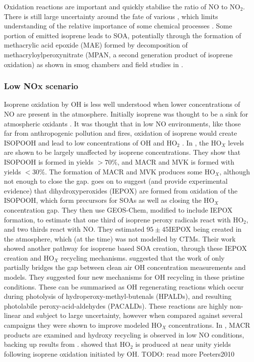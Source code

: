       
      Oxidation reactions are important and quickly stabilise the ratio of NO to NO$_2$. 
      There is still large uncertainty around the fate of various \roo, which limits understanding of the relative importance of some chemical processes \citep{Crounse2013}.
      Some portion of emitted isoprene leads to SOA, potentially through the formation of methacrylic acid epoxide (MAE) formed by decomposition of methacryloylperoxynitrate (MPAN, a second generation product of isoprene oxidation) as shown in smog chambers and field studies in \cite{Lin2013}.
    
    \subsubsection{Low NOx scenario}
      Isoprene oxidation by OH is less well understood when lower concentrations of NO are present in the atmosphere.
      Initially isoprene was thought to be a sink for atmospheric oxidants \citep[e.g.][]{Guenther2000}.
      It was thought that in low NO environments, like those far from anthropogenic pollution and fires, oxidation of isoprene would create ISOPOOH and lead to low concentrations of OH and HO$_2$ \cite{Paulot2009b}.
      In \cite{Paulot2009b}, the HO$_X$ levels are shown to be largely unaffected by isoprene concentrations.
      They show that ISOPOOH is formed in yields $> 70\%$, and MACR and MVK is formed with yields $< 30\%$.
      The formation of MACR and MVK produces some HO$_X$, although not enough to close the gap.
      \cite{Paulot2009b} goes on to suggest (and provide experimental evidence) that dihydroxyperoxides (IEPOX) are formed from oxidation of the ISOPOOH, which form precursors for SOAs as well as closing the HO$_X$ concentration gap.
      They then use GEOS-Chem, modified to include IEPOX formation, to estimate that one third of isoprene peroxy radicals react with HO$_2$, and two thirds react with NO. 
      They estimated $95 \pm 45$\tgpyr IEPOX being created in the atmosphere, which (at the time) was not modelled by CTMs.
      Their work showed another pathway for isoprene based SOA creation, through these IEPOX creation and HO$_X$ recycling mechanisms.
      \cite{Peeters2010} suggested that the work of \cite{Paulot2009b} only partially bridges the gap between clean air OH concentration measurements and models.
      They suggested four new mechanisms for OH recycling in these pristine conditions.
      These can be summarised as OH regenerating reactions which occur during photolysis of hydroperoxy-methyl-butenals (HPALDs), and resulting photolabile peroxy-acid-aldehydes (PACALDs).
      These reactions are highly non-linear and subject to large uncertainty, however when compared against several campaigns they were shown to improve modeled HO$_X$ concentrations.
      In \cite{Crounse2012}, MACR products are examined and hydroxy recycling is observed in low NO conditions, backing up results from \cite{Peeters2010}.
      \cite{Peeters2010} showed that HO$_2$ is produced at near unity yields following isoprene oxidation initiated by OH.
      TODO: read more Peeters2010
      
